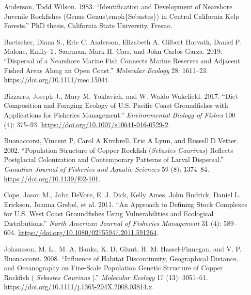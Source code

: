 \documentclass[11pt,
  english,
  letterpaper,
]{article}
\newlength{\cslhangindent}
\newenvironment{CSLReferences}[2] %
 {%
  \setlength{\parindent}{0pt}
  \ifodd #1 \everypar{\setlength{\hangindent}{\cslhangindent}}\ignorespaces\fi
  \ifnum #2 > 0
  \setlength{\parskip}{#2\baselineskip}
  \fi
 }%
 {}
\begin{document}
\hypertarget{refs}{}
\begin{CSLReferences}{1}{0}
\leavevmode{}%
Anderson, Todd Wilson. 1983. {``Identification and Development of Nearshore Juvenile Rockfishes (Genus Genus{\textbackslash{}}emph\{{Sebastes}\}) in Central {California} Kelp Forests.''} PhD thesis, California State University, Fresno.

\leavevmode{}%
Baetscher, Diana S., Eric C. Anderson, Elizabeth A. Gilbert Horvath, Daniel P. Malone, Emily T. Saarman, Mark H. Carr, and John Carlos Garza. 2019. {``Dispersal of a Nearshore Marine Fish Connects Marine Reserves and Adjacent Fished Areas Along an Open Coast.''} \emph{Molecular Ecology} 28: 1611--23. \url{https://doi.org/10.1111/mec.15044}.

\leavevmode{}%
Bizzarro, Joseph J., Mary M. Yoklavich, and W. Waldo Wakefield. 2017. {``Diet Composition and Foraging Ecology of {U}.{S}. {Pacific} {Coast} Groundfishes with Applications for Fisheries Management.''} \emph{Environmental Biology of Fishes} 100 (4): 375--93. \url{https://doi.org/10.1007/s10641-016-0529-2}.

\leavevmode{}%
Buonaccorsi, Vincent P, Carol A Kimbrell, Eric A Lynn, and Russell D Vetter. 2002. {``Population Structure of Copper Rockfish (\emph{{Sebastes} Caurinus}) Reflects Postglacial Colonization and Contemporary Patterns of Larval Dispersal.''} \emph{Canadian Journal of Fisheries and Aquatic Sciences} 59 (8): 1374--84. \url{https://doi.org/10.1139/f02-101}.

\leavevmode{}%
Cope, Jason M., John DeVore, E. J. Dick, Kelly Ames, John Budrick, Daniel L. Erickson, Joanna Grebel, et al. 2011. {``An {Approach} to {Defining} {Stock} {Complexes} for {U}.{S}. {West} {Coast} {Groundfishes} {Using} {Vulnerabilities} and {Ecological} {Distributions}.''} \emph{North American Journal of Fisheries Management} 31 (4): 589--604. \url{https://doi.org/10.1080/02755947.2011.591264}.

\leavevmode{}%
Johansson, M. L., M. A. Banks, K. D. Glunt, H. M. Hassel-Finnegan, and V. P. Buonaccorsi. 2008. {``Influence of Habitat Discontinuity, Geographical Distance, and Oceanography on Fine-Scale Population Genetic Structure of Copper Rockfish ( \emph{{Sebastes} Caurinus} ).''} \emph{Molecular Ecology} 17 (13): 3051--61. \url{https://doi.org/10.1111/j.1365-294X.2008.03814.x}.


\end{CSLReferences}
\end{document}
